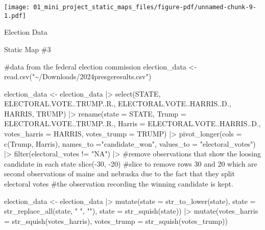 \documentclass[
  letterpaper,
  DIV=11,
  numbers=noendperiod]{scrartcl}
\newenvironment{Shaded}{\begin{snugshade}}{\end{snugshade}}
\newcommand{\AttributeTok}[1]{\textcolor[rgb]{0.40,0.45,0.13}{#1}}
\newcommand{\CommentTok}[1]{\textcolor[rgb]{0.37,0.37,0.37}{#1}}
\newcommand{\DecValTok}[1]{\textcolor[rgb]{0.68,0.00,0.00}{#1}}
\newcommand{\FunctionTok}[1]{\textcolor[rgb]{0.28,0.35,0.67}{#1}}
\newcommand{\NormalTok}[1]{\textcolor[rgb]{0.00,0.23,0.31}{#1}}
\newcommand{\OtherTok}[1]{\textcolor[rgb]{0.00,0.23,0.31}{#1}}
\newcommand{\SpecialCharTok}[1]{\textcolor[rgb]{0.37,0.37,0.37}{#1}}
\newcommand{\StringTok}[1]{\textcolor[rgb]{0.13,0.47,0.30}{#1}}
\begin{document}
\texttt{[image: 01\_mini\_project\_static\_maps\_files/figure-pdf/unnamed-chunk-9-1.pdf]}

Election Data

Static Map \#3

\begin{Shaded}
\begin{Highlighting}[]
\CommentTok{\#data from the federal election commission}
\NormalTok{election\_data }\OtherTok{\textless{}{-}} \FunctionTok{read.csv}\NormalTok{(}\StringTok{"\textasciitilde{}/Downloads/2024presgeresults.csv"}\NormalTok{)}

\NormalTok{election\_data }\OtherTok{\textless{}{-}}\NormalTok{ election\_data }\SpecialCharTok{|\textgreater{}}
  \FunctionTok{select}\NormalTok{(STATE, ELECTORAL.VOTE..TRUMP..R., ELECTORAL.VOTE..HARRIS..D., HARRIS, TRUMP) }\SpecialCharTok{|\textgreater{}}
  \FunctionTok{rename}\NormalTok{(}\AttributeTok{state =}\NormalTok{ STATE, }
         \AttributeTok{Trump =}\NormalTok{ ELECTORAL.VOTE..TRUMP..R., }
         \AttributeTok{Harris =}\NormalTok{ ELECTORAL.VOTE..HARRIS..D.,}
         \AttributeTok{votes\_harris =}\NormalTok{ HARRIS,}
         \AttributeTok{votes\_trump =}\NormalTok{ TRUMP) }\SpecialCharTok{|\textgreater{}}
  \FunctionTok{pivot\_longer}\NormalTok{(}\AttributeTok{cols =} \FunctionTok{c}\NormalTok{(Trump, Harris),}
               \AttributeTok{names\_to =}\StringTok{"candidate\_won"}\NormalTok{,}
               \AttributeTok{values\_to =} \StringTok{"electoral\_votes"}\NormalTok{) }\SpecialCharTok{|\textgreater{}}
  \FunctionTok{filter}\NormalTok{(electoral\_votes }\SpecialCharTok{!=} \StringTok{"NA"}\NormalTok{) }\SpecialCharTok{|\textgreater{}} \CommentTok{\#remove observations that show the loosing candidate in each state}
  \FunctionTok{slice}\NormalTok{(}\SpecialCharTok{{-}}\DecValTok{30}\NormalTok{, }\SpecialCharTok{{-}}\DecValTok{20}\NormalTok{) }
\CommentTok{\#slice to remove rows 30 and 20 which are second observations of maine and nebraska due to the fact that they split electoral votes}
\CommentTok{\#the observation recording the winning candidate is kept. }

\NormalTok{election\_data }\OtherTok{\textless{}{-}}\NormalTok{ election\_data }\SpecialCharTok{|\textgreater{}}
  \FunctionTok{mutate}\NormalTok{(}\AttributeTok{state =} \FunctionTok{str\_to\_lower}\NormalTok{(state),}
         \AttributeTok{state =} \FunctionTok{str\_replace\_all}\NormalTok{(state, }\StringTok{" "}\NormalTok{, }\StringTok{""}\NormalTok{),}
         \AttributeTok{state =} \FunctionTok{str\_squish}\NormalTok{(state)) }\SpecialCharTok{|\textgreater{}}
  \FunctionTok{mutate}\NormalTok{(}\AttributeTok{votes\_harris =} \FunctionTok{str\_squish}\NormalTok{(votes\_harris),}
         \AttributeTok{votes\_trump =} \FunctionTok{str\_squish}\NormalTok{(votes\_trump))}
\end{Highlighting}
\end{Shaded}
\end{document}
